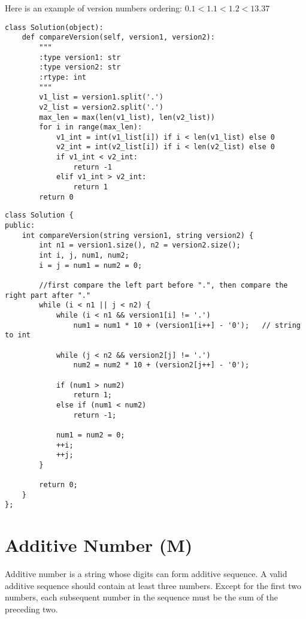 Here is an example of version numbers ordering: $0.1 < 1.1 < 1.2 < 13.37$\\

\begin{lstlisting}
class Solution(object):
    def compareVersion(self, version1, version2):
        """
        :type version1: str
        :type version2: str
        :rtype: int
        """
        v1_list = version1.split('.')
        v2_list = version2.split('.')
        max_len = max(len(v1_list), len(v2_list))
        for i in range(max_len):
            v1_int = int(v1_list[i]) if i < len(v1_list) else 0
            v2_int = int(v2_list[i]) if i < len(v2_list) else 0
            if v1_int < v2_int:
                return -1
            elif v1_int > v2_int:
                return 1
        return 0
\end{lstlisting}
        

\begin{lstlisting}
class Solution {
public:
    int compareVersion(string version1, string version2) {
        int n1 = version1.size(), n2 = version2.size();
        int i, j, num1, num2;
        i = j = num1 = num2 = 0;
        
        //first compare the left part before ".", then compare the right part after "."
        while (i < n1 || j < n2) {
            while (i < n1 && version1[i] != '.')
                num1 = num1 * 10 + (version1[i++] - '0');   // string to int

            while (j < n2 && version2[j] != '.')
                num2 = num2 * 10 + (version2[j++] - '0');
            
            if (num1 > num2)
                return 1;
            else if (num1 < num2)
                return -1;
            
            num1 = num2 = 0;
            ++i;
            ++j;
        }
        
        return 0;
    }
};
\end{lstlisting}


\section{Additive Number (M)}
Additive number is a string whose digits can form additive sequence. A valid additive sequence should contain at least three numbers. Except for the first two numbers, each subsequent number in the sequence must be the sum of the preceding two.\\

